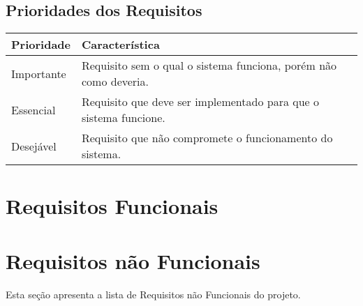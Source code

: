 \documentclass{article}
\begin{document}
	  \subsection{Prioridades dos Requisitos}
	    \FloatBarrier
	    \begin{table}[H]
	      \begin{center}
	        \begin{tabular}[pos]{|m{2cm} | m{12cm}|} 
	          \hline
	          \cellcolor[gray]{0.9}\textbf{Prioridade} & \cellcolor[gray]{0.9}\textbf{Característica} \\ \hline
	          Importante      & Requisito sem o qual o sistema funciona, porém não como deveria.  \\ \hline
	          Essencial       & Requisito que deve ser implementado para que o sistema funcione.  \\ \hline
	          Desejável       & Requisito que não compromete o funcionamento do sistema.  \\ \hline
	        \end{tabular}
	      \end{center}
	    \end{table}  
	
	\section{Requisitos Funcionais}
	
	
	
	
	    
	
	      
	
	 
	
		  
	 \section{Requisitos não Funcionais}
	  Esta seção apresenta a lista de Requisitos não Funcionais do projeto.
	  
\end{document}
